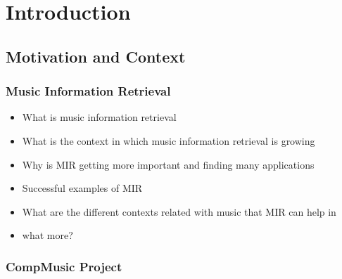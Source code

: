 
\chapter{Introduction}
\label{chap:intro}

\section{Motivation and Context}
\label{sec:intro_motivation}




\subsection{Music Information Retrieval}
\label{sec:intro_motivation_mir}

\begin{itemize}
	\item What is music information retrieval
	\item What is the context in which music information retrieval is growing
	\item Why is MIR getting more important and finding many applications
	\item Successful examples of MIR
	\item What are the different contexts related with music that MIR can help in
	\item what more?
\end{itemize}

\subsection{CompMusic Project}
\label{sec:intro_motivation_compmusic}


